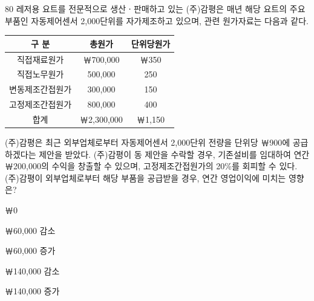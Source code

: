 \begin{question}{80}
레저용 요트를 전문적으로 생산ㆍ판매하고 있는 (주)감평은 매년 해당 요트의 주요 부품인 자동제어센서 2,000단위를 자가제조하고 있으며, 관련 원가자료는 다음과 같다.
\par{\small\centering\begin{tabular}{|c|c|c|}\hline
구 분 & 총원가 & 단위당원가 \\ \hline
직접재료원가 & ￦700,000 & ￦350 \\ \hline
직접노무원가 & 500,000 & 250 \\ \hline
변동제조간접원가 & 300,000 & 150 \\ \hline
고정제조간접원가 & 800,000 & 400 \\ \hline
합계 & ￦2,300,000 & ￦1,150 \\ \hline
\end{tabular}\par}
(주)감평은 최근 외부업체로부터 자동제어센서 2,000단위 전량을 단위당 ￦900에 공급하겠다는 제안을 받았다. (주)감평이 동 제안을 수락할 경우, 기존설비를 임대하여 연간 ￦200,000의 수익을 창출할 수 있으며, 고정제조간접원가의 20\%를 회피할 수 있다. (주)감평이 외부업체로부터 해당 부품을 공급받을 경우, 연간 영업이익에 미치는 영향은?
\begin{choices}
  \item ￦0
  \item ￦60,000 감소
  \item ￦60,000 증가
  \item ￦140,000 감소
  \item ￦140,000 증가
\end{choices}
\end{question}
